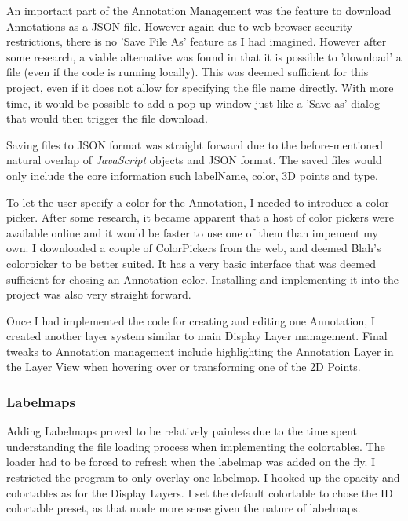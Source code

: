 \documentclass[a4paper,11pt,twoside]{article}
\begin{document}
An important part of the Annotation Management was the feature to download Annotations as a JSON file. However again due to web browser security restrictions, there is no 'Save File As' feature as I had imagined. However after some research, a viable alternative was found in that it is possible to 'download' a file (even if the code is running locally). This was deemed sufficient for this project, even if it does not allow for specifying the file name directly. With more time, it would be possible to add a pop-up window just like a 'Save as' dialog that would then trigger the file download.

Saving files to JSON format was straight forward due to the before-mentioned natural overlap of \textit{JavaScript} objects and JSON format. The saved files would only include the core information such labelName, color, 3D points and type.

To let the user specify a color for the Annotation, I needed to introduce a color picker. After some research, it became apparent that a host of color pickers were available online and it would be faster to use one of them than impement my own. I downloaded a couple of ColorPickers from the web, and deemed Blah's colorpicker to be better suited. It has a very basic interface that was deemed sufficient for chosing an Annotation color. Installing and implementing it into the project was also very straight forward.

Once I had implemented the code for creating and editing one Annotation, I created another layer system similar to main Display Layer management. Final tweaks to Annotation management include highlighting the Annotation Layer in the Layer View when hovering over or transforming one of the 2D Points.


\subsubsection{Labelmaps}

Adding Labelmaps proved to be relatively painless due to the time spent understanding the file loading process when implementing the colortables. The loader had to be forced to refresh when the labelmap was added on the fly. I restricted the program to only overlay one labelmap. I hooked up the opacity and colortables as for the Display Layers. I set the default colortable to chose the ID colortable preset, as that made more sense given the nature of labelmaps.
\end{document}
